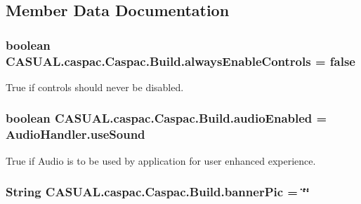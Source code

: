 \subsection{Member Data Documentation}
\hypertarget{class_c_a_s_u_a_l_1_1caspac_1_1_caspac_1_1_build_a64018302864b3074bde755ce8c1b52f0}{
\subsubsection[{always\-Enable\-Controls}]{\setlength{\rightskip}{0pt plus 5cm}boolean C\-A\-S\-U\-A\-L.\-caspac.\-Caspac.\-Build.\-always\-Enable\-Controls = false}}\label{class_c_a_s_u_a_l_1_1caspac_1_1_caspac_1_1_build_a64018302864b3074bde755ce8c1b52f0}
True if controls should never be disabled. \hypertarget{class_c_a_s_u_a_l_1_1caspac_1_1_caspac_1_1_build_adee517a9e5916fb44b09717997bf6ee4}{
\subsubsection[{audio\-Enabled}]{\setlength{\rightskip}{0pt plus 5cm}boolean C\-A\-S\-U\-A\-L.\-caspac.\-Caspac.\-Build.\-audio\-Enabled = {\bf Audio\-Handler.\-use\-Sound}}}\label{class_c_a_s_u_a_l_1_1caspac_1_1_caspac_1_1_build_adee517a9e5916fb44b09717997bf6ee4}
True if Audio is to be used by application for user enhanced experience. \hypertarget{class_c_a_s_u_a_l_1_1caspac_1_1_caspac_1_1_build_a03022857b99f76633714c420ee0e6eb5}{
\subsubsection[{banner\-Pic}]{\setlength{\rightskip}{0pt plus 5cm}String C\-A\-S\-U\-A\-L.\-caspac.\-Caspac.\-Build.\-banner\-Pic = \char`\"{}\char`\"{}}}\label{class_c_a_s_u_a_l_1_1caspac_1_1_caspac_1_1_build_a03022857b99f76633714c420ee0e6eb5}
